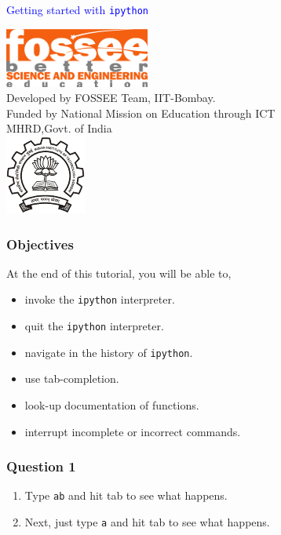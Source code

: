\documentclass[presentation]{beamer}
\title{}
\author{FOSSEE}
\date{}
\begin{document}
\begin{frame}

\begin{center}
\vspace{12pt}
\textcolor{blue}{\huge Getting started with \texttt{ipython}}
\end{center}
\vspace{18pt}
\begin{center}
\vspace{10pt}
\includegraphics[scale=0.95]{../images/fossee-logo.png}\\
\vspace{5pt}
\scriptsize Developed by FOSSEE Team, IIT-Bombay. \\ 
\scriptsize Funded by National Mission on Education through ICT\\
\scriptsize  MHRD,Govt. of India\\
\includegraphics[scale=0.30]{../images/iitb-logo.png}\\
\end{center}
\end{frame}
\begin{frame}
\frametitle{Objectives}
\label{sec-2}

  At the end of this tutorial, you will be able to, 

\begin{itemize}
\item invoke the \verb~ipython~ interpreter.
\item quit the \verb~ipython~ interpreter.
\item navigate in the history of \verb~ipython~.
\item use tab-completion.
\item look-up documentation of functions.
\item interrupt incomplete or incorrect commands.
\end{itemize}
\end{frame}
\begin{frame}
\frametitle{Question 1}
\label{sec-3}


\begin{enumerate}
\item Type \texttt{ab} and hit tab to see what happens.
\item Next, just type \texttt{a} and hit tab to see what happens.
\end{enumerate}
\end{frame}
\end{document}
